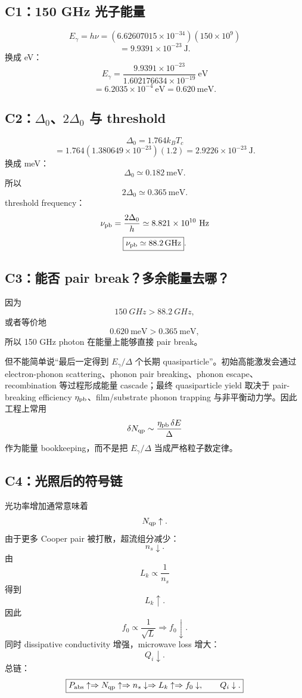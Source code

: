 \documentclass[11pt,a4paper,openany]{ctexrep}
\begin{document}
\subsection*{C1：150 GHz 光子能量}

\[
E_\gamma=h\nu
=(6.62607015\times10^{-34})(150\times10^9)
\]
\[
=9.9391\times10^{-23}\ \mathrm{J}.
\]
换成 eV：
\[
E_\gamma
=\frac{9.9391\times10^{-23}}{1.602176634\times10^{-19}}\ \mathrm{eV}
\]
\[
=6.2035\times10^{-4}\ \mathrm{eV}
=\boxed{0.620\ \mathrm{meV}}.
\]

\subsection*{C2：$\Delta_0$、$2\Delta_0$ 与 threshold}

\[
\Delta_0=1.764k_BT_c
\]
\[
=1.764(1.380649\times10^{-23})(1.2)
=2.9226\times10^{-23}\ \mathrm{J}.
\]
换成 meV：
\[
\boxed{\Delta_0\simeq0.182\ \mathrm{meV}}.
\]
所以
\[
\boxed{2\Delta_0\simeq0.365\ \mathrm{meV}}.
\]
threshold frequency：
\[
\nu_{\rm pb}=\frac{2\Delta_0}{h}
\simeq8.821\times10^{10}\ \mathrm{Hz}
\]
\[
\boxed{\nu_{\rm pb}\simeq\SI{88.2}{GHz}}.
\]

\subsection*{C3：能否 pair break？多余能量去哪？}

因为
\[
\SI{150}{GHz}>\SI{88.2}{GHz},
\]
或者等价地
\[
0.620\ \mathrm{meV}>0.365\ \mathrm{meV},
\]
所以 150 GHz photon 在能量上能够直接 pair break。

但不能简单说“最后一定得到 $E_\gamma/\Delta$ 个长期 quasiparticle”。初始高能激发会通过 electron-phonon scattering、phonon pair breaking、phonon escape、recombination 等过程形成能量 cascade；最终 quasiparticle yield 取决于 pair-breaking efficiency $\eta_{\rm pb}$、film/substrate phonon trapping 与非平衡动力学。因此工程上常用
\[
\delta N_{\rm qp}\sim\frac{\eta_{\rm pb}\,\delta E}{\Delta}
\]
作为能量 bookkeeping，而不是把 $E_\gamma/\Delta$ 当成严格粒子数定律。

\subsection*{C4：光照后的符号链}

光功率增加通常意味着
\[
N_{\rm qp}\uparrow.
\]
由于更多 Cooper pair 被打散，超流组分减少：
\[
n_s\downarrow.
\]
由
\[
L_k\propto\frac1{n_s}
\]
得到
\[
L_k\uparrow.
\]
因此
\[
f_0\propto\frac1{\sqrt{L}}
\Rightarrow
f_0\downarrow.
\]
同时 dissipative conductivity 增强，microwave loss 增大：
\[
Q_i\downarrow.
\]
总链：
\[
\boxed{
P_{\rm abs}\uparrow
\Rightarrow N_{\rm qp}\uparrow
\Rightarrow n_s\downarrow
\Rightarrow L_k\uparrow
\Rightarrow f_0\downarrow,
\qquad Q_i\downarrow.
}
\]
\end{document}
